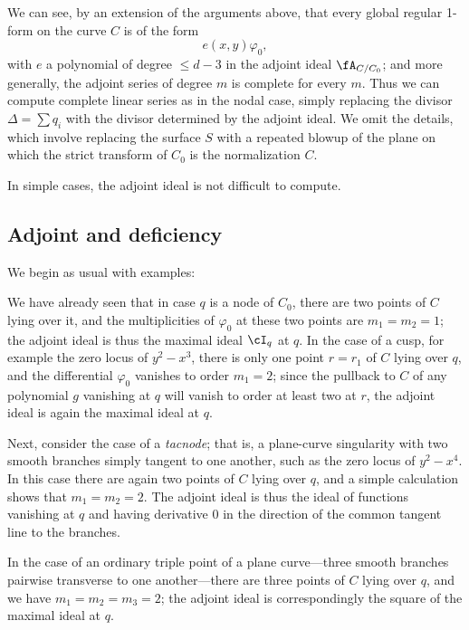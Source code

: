We can see, by an extension of the arguments above,  that every global regular 1-form on the curve $C$ is of the form 
$$
e(x,y) \varphi_0,
$$
with $e$ a polynomial of degree $\leq d-3$ in the adjoint ideal $\fA_{C/C_0}$; and more generally, the adjoint series of degree $m$ is complete for every $m$. Thus  we can compute complete linear series as in the nodal case, simply replacing
the divisor $\Delta = \sum q_i$ with the divisor determined by the adjoint ideal. We omit the details, which involve replacing
the surface $S$ with a repeated blowup of the plane on which the strict transform of $C_0$ is the normalization $C$.

In simple cases, the adjoint ideal is not difficult to compute. 

\subsection{Adjoint and deficiency}\label{adjoint ideal}

We begin as usual with examples:


\begin{example}
We have already seen that in case $q$ is a node of $C_0$, there are two points of $C$ lying over it, and the multiplicities of $\varphi_0$ at these two points are $m_1=m_2=1$; the adjoint ideal is thus 
 the maximal ideal $\cI_q$ at $q$. In the case of a cusp, for example the zero locus of $y^2-x^3$, there is only one point $r=r_1$ of $C$ lying over $q$, and the differential $\varphi_0$ vanishes to order $m_1=2$; since the pullback to $C$ of any polynomial $g$ vanishing at $q$ will vanish to order at least two at $r$, the adjoint ideal is again the maximal ideal at $q$.
\end{example}

\begin{example}[tacnodes]
Next, consider the case of a \emph{tacnode}; that is, a plane-curve singularity with two smooth branches simply tangent to one another, such as the zero locus of $y^2-x^4$. In this case there are again two points of $C$ lying over $q$, and a simple calculation shows that $m_1=m_2=2$. The adjoint ideal is thus the ideal of functions vanishing at $q$ and having derivative 0 in the direction of the common tangent line to the branches.
\end{example}

\begin{example}
In the case of an ordinary triple point of a plane curve---three smooth branches pairwise transverse to one another---there are three points of $C$ lying over $q$, and we have $m_1=m_2=m_3= 2$; the adjoint ideal is correspondingly 
 the square of the maximal ideal at $q$. 
\end{example}


